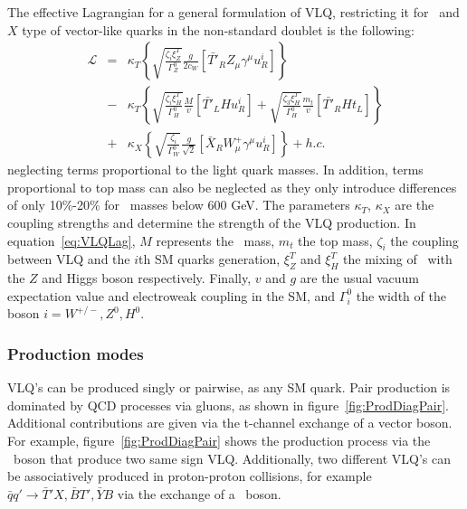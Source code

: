 The effective Lagrangian for a general formulation of VLQ, restricting it for \Tp~and $X$ type of vector-like quarks in the non-standard doublet is the following:
\begin{eqnarray}
  \mathcal{L} & = & \kappa_{T}\left\{ \sqrt{\frac{\zeta_{i}\xi_{Z}^{T}}{\Gamma_{Z}^{0}}}\frac{g}{2c_{W}}\left[ \bar{T'}_{R}Z_{\mu}\gamma^{\mu}u^{i}_{R}\right]\right\} \nonumber\\
              & - & \kappa_{T}\left\{ \sqrt{\frac{\zeta_{i}\xi_{H}^{T}}{\Gamma_{H}^{0}}}\frac{M}{v}\left[ \bar{T'}_{L}Hu^{i}_{R}\right] + \sqrt{\frac{\zeta_{3}\xi_{H}^{T}}{\Gamma_{H}^{0}}}\frac{m_{t}}{v}\left[ \bar{T'}_{R}Ht_{L}\right]\right\} \nonumber\\            
              & + & \kappa_{X}\left\{ \sqrt{\frac{\zeta_{i}}{\Gamma_{W}^{0}}}\frac{g}{\sqrt{2}}\left[ \bar{X}_{R}W^{+}_{\mu}\gamma^{\mu}u^{i}_{R}\right]\right\} +h.c.
\label{eq:VLQLag}
\end{eqnarray} 
neglecting terms proportional to the light quark masses. In addition, terms proportional to top mass can also be neglected as they only introduce differences of only 10\%-20\% for \Tp~masses below 600 GeV. The parameters $\kappa_T$, $\kappa_X$ are the coupling strengths and determine the strength of the VLQ production. In equation~\ref{eq:VLQLag}, $M$ represents the \Tp~mass, $m_{t}$ the top mass, $\zeta_{i}$ the coupling between VLQ and the $i$th SM quarks generation, $\xi_{Z}^{T}$ and $\xi_{H}^{T}$  the mixing of \Tp~with the $Z$ and Higgs boson respectively. Finally, $v$ and $g$ are the usual vacuum expectation value and electroweak coupling in the SM, and $\Gamma^{0}_{i}$ the width of the boson $i=W^{+/-},Z^{0},H^{0}$.

\subsubsection{Production modes}
\label{sec:prod}

VLQ's can be produced singly or pairwise, as any SM quark. Pair production is dominated by QCD processes via gluons, as shown in figure~\ref{fig:ProdDiagPair}. Additional contributions are given via the t-channel exchange of a vector boson. For example, figure~\ref{fig:ProdDiagPair} shows the production process via the \Z~boson that produce two same sign VLQ. Additionally, two different VLQ's can be associatively produced in proton-proton collisions, for example${\bar{q}q' \to \bar{T}'X, \bar{B}T', \bar{Y}B}$ via the exchange of a \W~boson.

